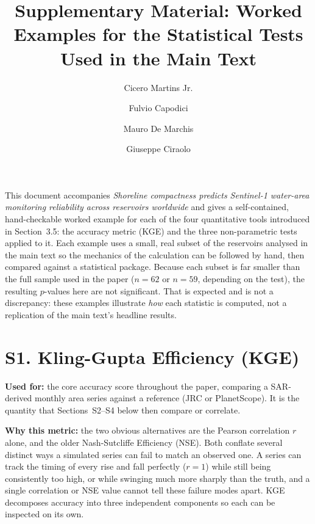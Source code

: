 \documentclass[12pt,authoryear]{elsarticle}
\begin{document}
\begin{frontmatter}
\title{Supplementary Material: Worked Examples for the Statistical Tests
       Used in the Main Text}
\author[unipa]{Cicero Martins Jr.}
\author[unipa]{Fulvio Capodici}
\author[unipa]{Mauro De Marchis}
\author[unipa]{Giuseppe Ciraolo}
\end{frontmatter}

\noindent This document accompanies
\emph{Shoreline compactness predicts Sentinel-1 water-area monitoring
reliability across reservoirs worldwide} and gives a self-contained,
hand-checkable worked example for each of the four quantitative tools
introduced in Section~3.5: the accuracy metric (KGE) and the three
non-parametric tests applied to it. Each example uses a small, real subset of
the reservoirs analysed in the main text so the mechanics of the calculation
can be followed by hand, then compared against a statistical package. Because
each subset is far smaller than the full sample used in the paper ($n=62$ or
$n=59$, depending on the test), the resulting $p$-values here are not
significant. That is expected and is not a discrepancy: these examples
illustrate \emph{how} each statistic is computed, not a replication of the
main text's headline results.

\section*{S1. Kling-Gupta Efficiency (KGE) \citep{Gupta2009}}

\textbf{Used for:} the core accuracy score throughout the paper, comparing
a SAR-derived monthly area series against a reference (JRC or PlanetScope).
It is the quantity that Sections~S2--S4 below then compare or correlate.

\textbf{Why this metric:} the two obvious alternatives are the Pearson
correlation $r$ alone, and the older Nash-Sutcliffe Efficiency (NSE). Both
conflate several distinct ways a simulated series can fail to match an
observed one. A series can track the timing of every rise and fall
perfectly ($r=1$) while still being consistently too high, or while swinging
much more sharply than the truth, and a single correlation or NSE value
cannot tell these failure modes apart. KGE decomposes accuracy into three
independent components so each can be inspected on its own.
\end{document}
